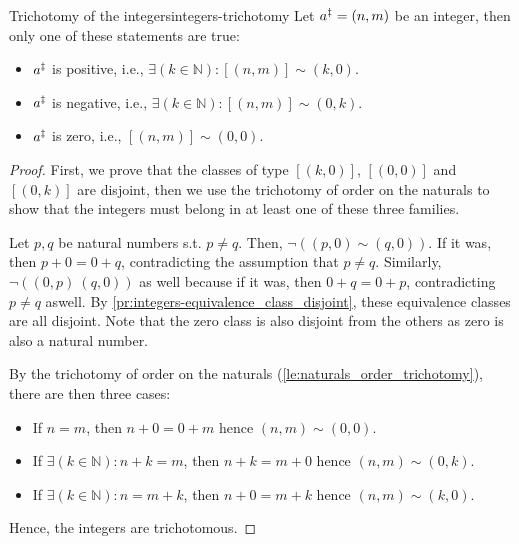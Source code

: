 \begin{lemma}{Trichotomy of the integers}{integers-trichotomy}
  Let \(a^{\ddagger} = (n, m)\) be an integer, then only one of these statements are true:
  \begin{itemize}[noitemsep]
    \item \(a^{\ddagger}\) is positive, i.e., \(\exists (k \in \mathbb{N}) : [(n, m)] \sim (k, 0)\).
    \item \(a^{\ddagger}\) is negative, i.e., \(\exists (k \in \mathbb{N}) : [(n, m)] \sim (0, k)\).
    \item \(a^{\ddagger}\) is zero, i.e., \([(n, m)] \sim (0, 0)\).
  \end{itemize}
\end{lemma}

\begin{proof}
  First, we prove that the classes of type \([(k, 0)]\), \([(0, 0)]\) and \([(0, k)]\) are disjoint,
  then we use the trichotomy of order on the naturals to show that the integers must belong in at
  least one of these three families.

  Let \(p, q\) be natural numbers s.t. \(p \neq q\). Then, \(\neg((p, 0) \sim (q, 0))\). If it
  was, then \(p + 0 = 0 + q\), contradicting the assumption that \(p \neq q\). Similarly,
  \(\neg((0, p) ~ (q, 0))\) as well because if it was, then \(0 + q = 0 + p\), contradicting
  \(p \neq q\) aswell. By \cref{pr:integers-equivalence_class_disjoint}, these equivalence classes
  are all disjoint. Note that the zero class is also disjoint from the others as zero is also a
  natural number.

  By the trichotomy of order on the naturals (\cref{le:naturals_order_trichotomy}), there are then
  three cases:
  \begin{itemize}
    \item If \(n = m\), then \(n + 0 = 0 + m\) hence \((n, m) \sim (0, 0)\).
    \item If \(\exists (k \in \mathbb{N}) : n + k = m\), then \(n + k = m + 0\) hence
          \((n, m) \sim (0, k)\).
    \item If \(\exists (k \in \mathbb{N}) : n = m + k\), then \(n + 0 = m + k\) hence
          \((n, m) \sim (k, 0)\).
  \end{itemize}
  Hence, the integers are trichotomous.
\end{proof}

